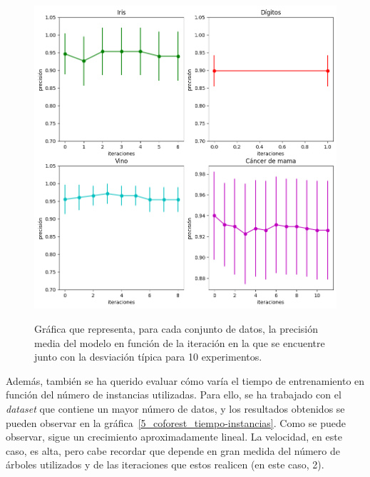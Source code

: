 \begin{figure}[h]
	\caption{Gráfica que representa, para cada conjunto de datos, la precisión media del modelo en función de la iteración en la que se encuentre junto con la desviación típica para 10 experimentos.}
	\centering
	\includegraphics[width=\textwidth]{../img/memoria/5_coforest_precision-iteraciones_individual}
	\label{5_coforest_precision-iteraciones_individual}
\end{figure}


Además, también se ha querido evaluar cómo varía el tiempo de entrenamiento en función del número de instancias utilizadas. Para ello, se ha trabajado con el \textit{dataset} que contiene un mayor número de datos, y los resultados obtenidos se pueden observar en la gráfica~\ref{5_coforest_tiempo-instancias}. Como se puede observar, sigue un crecimiento aproximadamente lineal. La velocidad, en este caso, es alta, pero cabe recordar que depende en gran medida del número de árboles utilizados y de las iteraciones que estos realicen (en este caso, 2).


